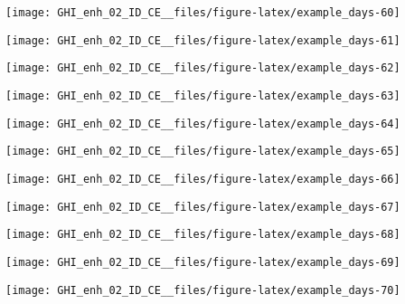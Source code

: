 \documentclass[
  10pt,
  a4paper,oneside]{article}
\begin{document}
\begin{center}\texttt{[image: GHI\_enh\_02\_ID\_CE\_\_files/figure-latex/example\_days-60]} \end{center}

\begin{center}\texttt{[image: GHI\_enh\_02\_ID\_CE\_\_files/figure-latex/example\_days-61]} \end{center}

\begin{center}\texttt{[image: GHI\_enh\_02\_ID\_CE\_\_files/figure-latex/example\_days-62]} \end{center}

\begin{center}\texttt{[image: GHI\_enh\_02\_ID\_CE\_\_files/figure-latex/example\_days-63]} \end{center}

\begin{center}\texttt{[image: GHI\_enh\_02\_ID\_CE\_\_files/figure-latex/example\_days-64]} \end{center}

\begin{center}\texttt{[image: GHI\_enh\_02\_ID\_CE\_\_files/figure-latex/example\_days-65]} \end{center}

\begin{center}\texttt{[image: GHI\_enh\_02\_ID\_CE\_\_files/figure-latex/example\_days-66]} \end{center}

\begin{center}\texttt{[image: GHI\_enh\_02\_ID\_CE\_\_files/figure-latex/example\_days-67]} \end{center}

\begin{center}\texttt{[image: GHI\_enh\_02\_ID\_CE\_\_files/figure-latex/example\_days-68]} \end{center}

\begin{center}\texttt{[image: GHI\_enh\_02\_ID\_CE\_\_files/figure-latex/example\_days-69]} \end{center}

\begin{center}\texttt{[image: GHI\_enh\_02\_ID\_CE\_\_files/figure-latex/example\_days-70]} \end{center}
\end{document}
